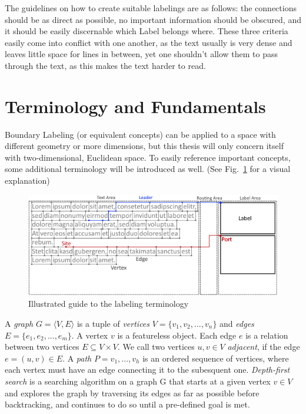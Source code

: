 \documentclass[11pt,a4paper]{vutinfth}
\begin{document}
The guidelines on how to create suitable labelings are as follows: the connections should be as direct as possible, no important information should be obscured, and it should be easily discernable which Label belongs where. These three criteria easily come into conflict with one another, as the text usually is very dense and leaves little space for lines in between, yet one shouldn't allow them to pass through the text, as this makes the text harder to read. 

\section{Terminology and Fundamentals} 
Boundary Labeling (or equivalent concepts) can be applied to a space with different geometry or more dimensions, but this thesis will only concern itself with two-dimensional, Euclidean space.
To easily reference important concepts, some additional terminology will be introduced as well. (See Fig.~\ref*{fig:term} for a visual explanation)


\begin{figure}
 \captionsetup{justification=centering, margin=0.75cm}
 \centering
  \includegraphics[scale=0.95]{GraphTerminologyExtended.png}
  \caption{Illustrated guide to the labeling terminology}
 \label{fig:term}
\end{figure}

A \emph{graph} $G=\langle V, E \rangle$ is a tuple of \emph{vertices} $V=\{v_1, v_2, ..., v_n\}$ and \emph{edges} $E=\{e_1, e_2, ..., e_m\}$. A vertex $v$ is a featureless object. %
 Each edge $e$ is a relation between two vertices $E \subseteq V\times V$. %
We call two vertices $u,v \in V$ \emph{adjacent}, if the edge $e=(u,v) \in E$.
 A \emph{path} $P=v_1, ..., v_h$ is an ordered sequence of vertices, where each vertex must have an edge connecting it to the subesquent one.
 \emph{Depth-first search} is a searching algorithm on a graph G that starts at a given vertex $v \in V$ and explores the graph by traversing its edges as far as possible before backtracking, and continues to do so until a pre-defined goal is met. 
\end{document}
